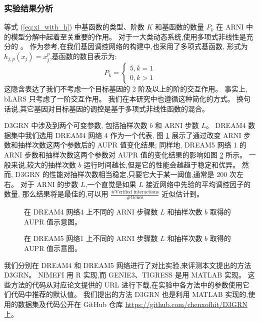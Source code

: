 \subsubsection{实验结果分析}

等式 (\ref{eq:xi_with_h}) 中基函数的类型、阶数 $K$ 和基函数的数量 $P_k$ 在 ARNI 中的模型分解中起着至关重要的作用。
对于一大类动态系统,使用多项式非线性是充分的 \cite{mangan2016inferring}。
作为参考,在我们基因调控网络的构建中,也采用了多项式基函数,
形式为 $h_{j,p}(x_j)=x_j^p$,基函数的数目表示为: 
\begin{equation}
P_k=\left\{\begin{matrix}
5,  k=1\\ 
0,  k>1
\end{matrix}\right. 
\end{equation}
这隐含表达了我们不考虑一个目标基因的 2 阶及以上的阶的交互作用。
事实上, bLARS \cite{singh2016blars} 只考虑了一阶交互作用。
我们在本研究中也遵循这种简化的方式。
换句话说,其它基因对目标基因的调控是基于多项式非线性函数的混合。

D3GRN 中涉及到两个可变参数,
包括抽样次数 $b$ 和 ARNI 步数 $L$。
DREAM4 数据集中我们选用 DREAM4 网络 4 作为一个代表,
图 \ref{fig:performance_dr4_4} 展示了通过改变 ARNI 步数和抽样次数这两个参数后的 AUPR 值变化结果;
同样地, DREAM5 网络 1 的 ARNI 步数和抽样次数这两个参数对 AUPR 值的变化结果的影响如图 \ref{fig:performance_dr5} 所示。
一般来说,较大的抽样次数 $b$ 运行时间越长,但是它的性能会越趋于稳定和优异。
然而, D3GRN 的性能对抽样次数相当稳定,只要它大于某一阈值,通常是 200 次左右。
对于 ARNI 的步数 $L$,一个直觉是如果 $L$ 接近网络中先验的平均调控因子的数量,
那么结果将是最佳的,可以用 $\frac{\#\text{Verified interactions}}{\#\text{Genes}}$ 近似估计到。

\begin{figure}[!htbp]
  \centering
  
  \caption{在 DREAM4 网络4 上不同的 ARNI 步骤数 $L$ 和抽样次数 $b$ 取得的 AUPR 值示意图。}
  \label{fig:performance_dr4_4}
\end{figure}

\begin{figure}[!htbp]
  \centering
  
  \caption{在 DREAM5 网络1 上不同的 ARNI 步骤数 $L$ 和抽样次数 $b$ 取得的 AUPR 值示意图。}
  \label{fig:performance_dr5}
\end{figure}

我们分别在 DREAM4 和 DREAM5 网络进行了对比实验,来评测本文提出的方法 D3GRN。
NIMEFI 用 R 实现,而 GENIE3、TIGRESS 是用 MATLAB 实现。
这些方法的代码从对应论文提供的 URL 进行下载,在实验中各方法中的参数使用它们代码中推荐的默认值。
我们提出的方法 D3GRN 也是利用 MATLAB 实现的,使用的数据集及代码公开在 GitHub 仓库 \url{https://github.com/chenxofhit/D3GRN} 上。

